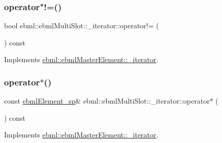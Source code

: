 \subsubsection{\texorpdfstring{operator"!=()}{operator!=()}}
{\footnotesize\ttfamily bool ebml\+::ebml\+Multi\+Slot\+::\+\_\+iterator\+::operator!= (\begin{DoxyParamCaption}\item[{const \mbox{\hyperlink{classebml_1_1ebmlMasterElement_1_1__iterator}{ebml\+Master\+Element\+::\+\_\+iterator}} \&}]{ }\end{DoxyParamCaption}) const\hspace{0.3cm}{\ttfamily [virtual]}}



Implements \mbox{\hyperlink{classebml_1_1ebmlMasterElement_1_1__iterator_aef9e45972d70a546942f9de73af40dc2}{ebml\+::ebml\+Master\+Element\+::\+\_\+iterator}}.

\mbox{\label{classebml_1_1ebmlMultiSlot_1_1__iterator_a3baa39c32ce95c538e8fee957d683e50}} 
\subsubsection{\texorpdfstring{operator$\ast$()}{operator*()}}
{\footnotesize\ttfamily const \mbox{\hyperlink{namespaceebml_adad533b7705a16bb360fe56380c5e7be}{ebml\+Element\+\_\+sp}}\& ebml\+::ebml\+Multi\+Slot\+::\+\_\+iterator\+::operator$\ast$ (\begin{DoxyParamCaption}{ }\end{DoxyParamCaption}) const\hspace{0.3cm}{\ttfamily [virtual]}}



Implements \mbox{\hyperlink{classebml_1_1ebmlMasterElement_1_1__iterator_a3275ab5cdba37d79dd323879598f4f5d}{ebml\+::ebml\+Master\+Element\+::\+\_\+iterator}}.

\mbox{\label{classebml_1_1ebmlMultiSlot_1_1__iterator_a59e3bf809115c2ef28cbaf05c0d78afd}} 

